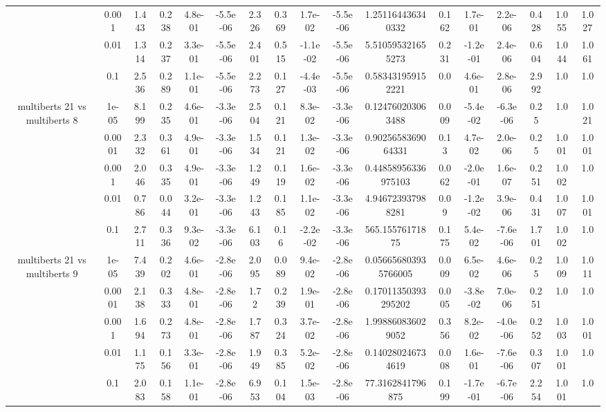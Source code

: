 \begin{tabular}{|c|c|c|c|c|c|c|c|c|c|c|c|c|c|c|c|c|}
 & 0.001 & 1.443 & 0.238 & 4.8e-01 & -5.5e-06 & 2.326 & 0.369 & 1.7e-02 & -5.5e-06 & 1.251164436340332 & 0.162 & 1.7e-01 & 2.2e-06 & 0.428 & 1.055 & 1.027 \\
 & 0.01 & 1.314 & 0.237 & 3.3e-01 & -5.5e-06 & 2.401 & 0.515 & -1.1e-02 & -5.5e-06 & 5.510595321655273 & 0.231 & -1.2e-01 & 2.4e-06 & 0.604 & 1.044 & 1.061 \\
 & 0.1 & 2.536 & 0.289 & 1.1e-01 & -5.5e-06 & 2.273 & 0.127 & -4.4e-03 & -5.5e-06 & 0.583431959152221 & 0.0 & 4.6e-01 & 2.8e-06 & 2.992 & 1.0 & 1.0 \\
\hline
\multirow{5}{*}{multiberts 21 vs multiberts 8} & 1e-05 & 8.199 & 0.235 & 4.6e-01 & -3.3e-06 & 2.504 & 0.121 & 8.3e-02 & -3.3e-06 & 0.124760203063488 & 0.009 & -5.4e-02 & -6.3e-06 & 0.25 & 1.0 & 1.021 \\
 & 0.0001 & 2.332 & 0.361 & 4.9e-01 & -3.3e-06 & 1.534 & 0.121 & 1.3e-02 & -3.3e-06 & 0.9025658369064331 & 0.13 & 4.7e-02 & 2.0e-06 & 0.25 & 1.001 & 1.001 \\
 & 0.001 & 2.046 & 0.335 & 4.9e-01 & -3.3e-06 & 1.249 & 0.119 & 1.6e-02 & -3.3e-06 & 0.44858956336975103 & 0.062 & -2.0e-01 & 1.6e-07 & 0.251 & 1.002 & 1.0 \\
 & 0.01 & 0.786 & 0.044 & 3.2e-01 & -3.3e-06 & 1.243 & 0.185 & 1.1e-02 & -3.3e-06 & 4.946723937988281 & 0.09 & -1.2e-02 & 3.9e-06 & 0.431 & 1.007 & 1.001 \\
 & 0.1 & 2.711 & 0.336 & 9.3e-02 & -3.3e-06 & 6.103 & 0.16 & -2.2e-02 & -3.3e-06 & 565.15576171875 & 0.175 & 5.4e-02 & -7.6e-06 & 1.701 & 1.002 & 1.0 \\
\hline
\multirow{5}{*}{multiberts 21 vs multiberts 9} & 1e-05 & 7.439 & 0.202 & 4.6e-01 & -2.8e-06 & 2.095 & 0.089 & 9.4e-02 & -2.8e-06 & 0.056656803935766005 & 0.009 & 6.5e-02 & 4.6e-06 & 0.25 & 1.009 & 1.011 \\
 & 0.0001 & 2.138 & 0.333 & 4.8e-01 & -2.8e-06 & 1.72 & 0.239 & 1.9e-01 & -2.8e-06 & 0.17011350393295202 & 0.005 & -3.8e-02 & 7.0e-06 & 0.251 & 1.0 & 1.0 \\
 & 0.001 & 1.694 & 0.273 & 4.8e-01 & -2.8e-06 & 1.787 & 0.324 & 3.7e-02 & -2.8e-06 & 1.998860836029052 & 0.356 & 8.2e-02 & -4.0e-06 & 0.252 & 1.003 & 1.001 \\
 & 0.01 & 1.175 & 0.156 & 3.3e-01 & -2.8e-06 & 1.949 & 0.385 & 5.2e-02 & -2.8e-06 & 0.140280246734619 & 0.008 & 1.6e-01 & -7.6e-06 & 0.307 & 1.001 & 1.0 \\
 & 0.1 & 2.083 & 0.158 & 1.1e-01 & -2.8e-06 & 6.953 & 0.104 & 1.5e-03 & -2.8e-06 & 77.3162841796875 & 0.199 & -1.7e-01 & -6.7e-06 & 2.254 & 1.001 & 1.0 \\

\end{tabular}

